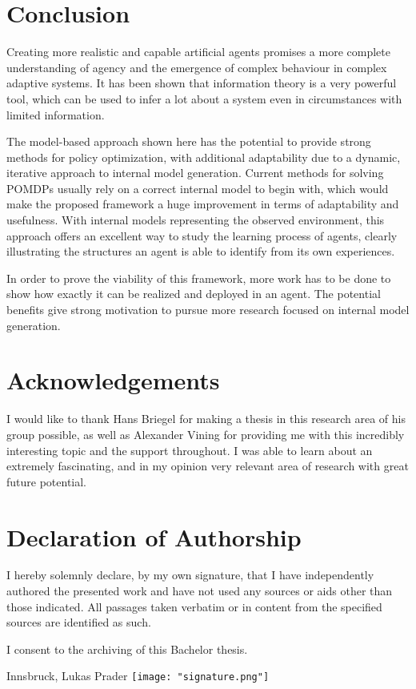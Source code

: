 \documentclass[12pt,a4paper]{article}
\begin{document}
\newpage
\section{Conclusion} \label{sec:conclusion}
Creating more realistic and capable artificial agents promises a more complete understanding of agency and the emergence of complex behaviour in complex adaptive systems.
It has been shown that information theory is a very powerful tool, which can be used to infer a lot about a system even in circumstances with limited information.

The model-based approach shown here has the potential to provide strong methods for policy optimization, with additional adaptability due to a dynamic, iterative approach to internal model generation.
Current methods for solving POMDPs usually rely on a correct internal model to begin with, which would make the proposed framework a huge improvement in terms of adaptability and usefulness.
With internal models representing the observed environment, this approach offers an excellent way to study the learning process of agents, clearly illustrating the structures an agent is able to identify from its own experiences.

In order to prove the viability of this framework, more work has to be done to show how exactly it can be realized and deployed in an agent.
The potential benefits give strong motivation to pursue more research focused on internal model generation.

\section{Acknowledgements} \label{sec:acknowledgements}
I would like to thank Hans Briegel for making a thesis in this research area of his group possible, as well as Alexander Vining for providing me with this incredibly interesting topic and the support throughout.
I was able to learn about an extremely fascinating, and in my opinion very relevant area of research with great future potential.

\clearpage
\section*{Declaration of Authorship}

I hereby solemnly declare, by my own signature, that I have independently authored the presented work and have not used any sources or aids other than those indicated. All passages taken verbatim or in content from the specified sources are identified as such.

I consent to the archiving of this Bachelor thesis.

\hfill
\vspace{2cm} Innsbruck, \findate \hfill Lukas Prader \texttt{[image: "signature.png"]}


\newpage
\printbibliography[]

\end{document}

